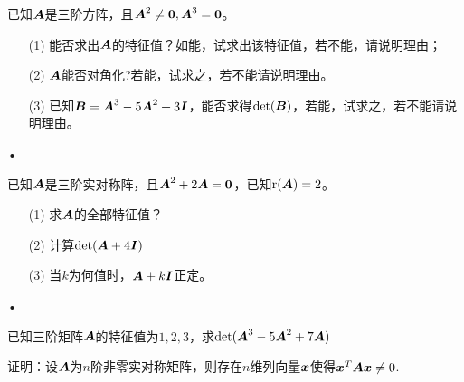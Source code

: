         \begin{frame}
          \begin{li}[08-09上]
            已知$\boldsymbol{A}$是三阶方阵，且$\MA^2\ne \M0, \MA^3=\M0$。
            \begin{itemize}
            \item[(1)] 能否求出$\boldsymbol{A}$的特征值？如能，试求出该特征值，若不能，请说明理由；
            \item[(2)] $\boldsymbol{A}$能否对角化?若能，试求之，若不能请说明理由。
            \item[(3)] 已知$\boldsymbol{B}=\boldsymbol{A}^3-5\boldsymbol{A}^2+3\boldsymbol{I}$，能否求得$\mathrm{det}(\boldsymbol{B})$，若能，试求之，若不能请说明理由。

            \end{itemize}•
          \end{li}

          
        \end{frame}



        \begin{frame} 
          

          \begin{li}[12-13下]
            已知$\boldsymbol{A}$是三阶实对称阵，且$\MA^2+2\MA= \M0$，已知$\mathrm{r}(\boldsymbol{A})=2$。
            \begin{itemize}
            \item[(1)] 求$\boldsymbol{A}$的全部特征值？ 
            \item[(2)] 计算$\mathrm{det}(\boldsymbol{A}+4\boldsymbol{I})$
            \item[(3)] 当$k$为何值时，$\boldsymbol{A}+k\boldsymbol{I}$正定。

            \end{itemize}•
          \end{li}

        \end{frame}

        \begin{frame}
          \begin{li}[12-13下]
            已知三阶矩阵$\boldsymbol{A}$的特征值为$1,2,3$，求$\mathrm{det}(\boldsymbol{A}^3-5\boldsymbol{A}^2+7\boldsymbol{A})$
          \end{li}
        \end{frame}

        \begin{frame}
          \begin{li}[12-13下]
            证明：设$\boldsymbol{A}$为$n$阶非零实对称矩阵，则存在$n$维列向量${\boldsymbol{x}}$使得${\boldsymbol{x}}^T\boldsymbol{A}{\boldsymbol{x}}\ne 0$.
          \end{li}          
        \end{frame}



